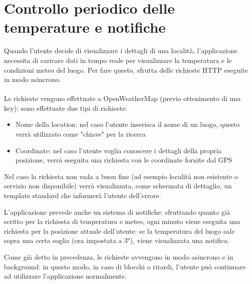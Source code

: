 \documentclass[twoside]{supsistudent}
\begin{document}
\section{Controllo periodico delle temperature e notifiche}
Quando l'utente decide di visualizzare i dettagli di una località, l'applicazione necessita di caricare dati in tempo reale per visualizzare la temperatura e le condizioni meteo del luogo. Per fare questo, sfrutta delle richieste HTTP eseguite in modo asincrono.
\\\\
Le richieste vengono effettuate a OpenWeatherMap (previo ottenimento di una key): sono effettuate due tipi di richieste:
\begin{itemize}
	\item Nome della location: nel caso l'utente inserisca il nome di un luogo, questo verrà utilizzato come "chiave" per la ricerca
	\item Coordinate: nel caso l'utente voglia conoscere i dettagli della propria posizione, verrà eseguita una richiesta con le coordinate fornite dal GPS
\end{itemize}

Nel caso la richiesta non vada a buon fine (ad esempio località non esistente o servizio non disponibile) verrà visualizzata, come schermata di dettaglio, un template standard che informerà l'utente dell'errore.

L'applicazione prevede anche un sistema di notifiche: sfruttando quanto già scritto per la richiesta di temperatura e meteo, ogni minuto viene eseguita una richiesta per la posizione attuale dell'utente: se la temperatura del luogo sale sopra una certa soglia (ora impostata a \ang{3}), viene visualizzata una notifica.

Come già detto in precedenza, le richieste avvengono in modo asincrono e in background: in questo modo, in caso di blocchi o ritardi, l'utente può continuare ad utilizzare l'applicazione normalmente.
\end{document}
